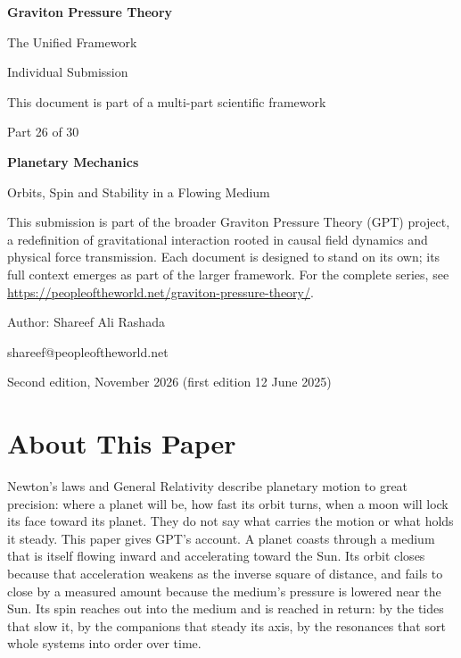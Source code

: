 \documentclass[11pt,a4paper]{article}
\begin{document}
\renewcommand{\thetable}{26.\arabic{table}}
\begin{titlepage}
\centering
\vspace*{1.5cm}
{\Huge\bfseries Graviton Pressure Theory\par}
\vspace{0.4cm}
{\Large The Unified Framework\par}
{\large Individual Submission\par}
\vspace{0.3cm}
{\normalsize This document is part of a multi-part scientific framework\par}
\vspace{1.6cm}
{\large Part 26 of 30\par}
\vspace{0.6cm}
{\huge\bfseries Planetary Mechanics\par}
\vspace{0.5cm}
{\Large Orbits, Spin and Stability in a Flowing Medium\par}
\vspace{1.4cm}
\begin{minipage}{0.82\textwidth}\centering\small
This submission is part of the broader Graviton Pressure Theory (GPT) project, a redefinition of gravitational interaction rooted in causal field dynamics and physical force transmission. Each document is designed to stand on its own; its full context emerges as part of the larger framework. For the complete series, see \url{https://peopleoftheworld.net/graviton-pressure-theory/}.
\end{minipage}
\vfill
{\large Author: Shareef Ali Rashada\par}
{\normalsize shareef@peopleoftheworld.net\par}
\vspace{0.3cm}
{\normalsize Second edition, November 2026 \quad (first edition 12 June 2025)\par}
\end{titlepage}

\tableofcontents
\newpage

\section*{About This Paper}

Newton's laws and General Relativity describe planetary motion to great precision: where a planet will be, how fast its orbit turns, when a moon will lock its face toward its planet. They do not say what carries the motion or what holds it steady. This paper gives GPT's account. A planet coasts through a medium that is itself flowing inward and accelerating toward the Sun. Its orbit closes because that acceleration weakens as the inverse square of distance, and fails to close by a measured amount because the medium's pressure is lowered near the Sun. Its spin reaches out into the medium and is reached in return: by the tides that slow it, by the companions that steady its axis, by the resonances that sort whole systems into order over time.
\end{document}
